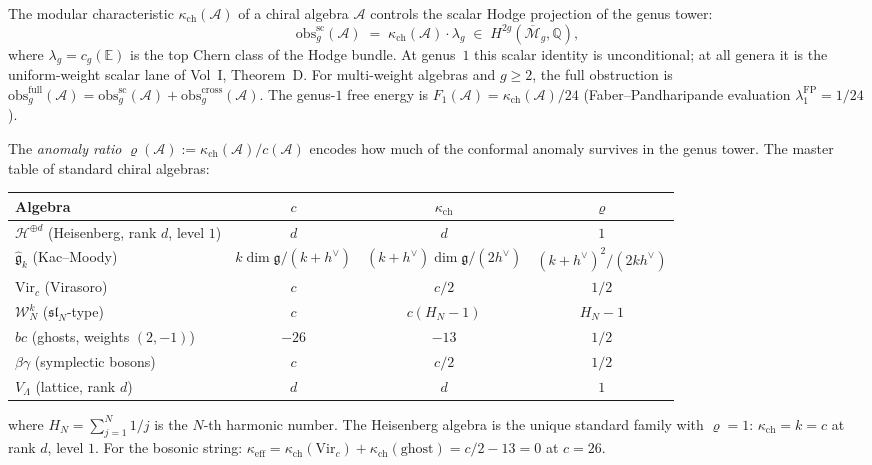 
The modular characteristic $\kappa_{\mathrm{ch}}(\mathcal{A})$ of a chiral algebra $\mathcal{A}$ controls the scalar Hodge projection of the genus tower:
\begin{equation}
\label{eq:phys-anom-obs-g}
 \mathrm{obs}^{\mathrm{sc}}_g(\mathcal{A}) \;=\; \kappa_{\mathrm{ch}}(\mathcal{A}) \cdot \lambda_g
 \;\in\; H^{2g}(\overline{\mathcal{M}}_g, \mathbb{Q}),
\end{equation}
where $\lambda_g = c_g(\mathbb{E})$ is the top Chern class of the Hodge bundle. At genus~$1$ this scalar identity is unconditional; at all genera it is the uniform-weight scalar lane of Vol~I, Theorem~D. For multi-weight algebras and $g\geq2$, the full obstruction is $\mathrm{obs}^{\mathrm{full}}_g(\mathcal{A})=\mathrm{obs}^{\mathrm{sc}}_g(\mathcal{A})+\mathrm{obs}^{\mathrm{cross}}_g(\mathcal{A})$. The genus-$1$ free energy is $F_1(\mathcal{A}) = \kappa_{\mathrm{ch}}(\mathcal{A})/24$ (Faber--Pandharipande evaluation $\lambda_1^{\mathrm{FP}} = 1/24$).

The \emph{anomaly ratio} $\varrho(\mathcal{A}) := \kappa_{\mathrm{ch}}(\mathcal{A})/c(\mathcal{A})$ encodes how much of the conformal anomaly survives in the genus tower. The master table of standard chiral algebras:
\begin{center}
\renewcommand{\arraystretch}{1.3}
\begin{tabular}{lccc}
\textbf{Algebra} & $c$ & $\kappa_{\mathrm{ch}}$ & $\varrho$ \\ \hline
$\mathcal{H}^{\oplus d}$ (Heisenberg, rank $d$, level $1$) & $d$ & $d$ & $1$ \\
$\widehat{\mathfrak{g}}_k$ (Kac--Moody) &
 $k\dim\mathfrak{g}/(k+h^\vee)$ &
 $(k+h^\vee)\dim\mathfrak{g}/(2h^\vee)$ &
 $(k+h^\vee)^2/(2kh^\vee)$ \\
$\mathrm{Vir}_c$ (Virasoro) & $c$ & $c/2$ & $1/2$ \\
$\mathcal{W}_N^k$ ($\mathfrak{sl}_N$-type) & $c$ & $c(H_N - 1)$ & $H_N - 1$ \\
$bc$ (ghosts, weights $(2,-1)$) & $-26$ & $-13$ & $1/2$ \\
$\beta\gamma$ (symplectic bosons) & $c$ & $c/2$ & $1/2$ \\
$V_\Lambda$ (lattice, rank $d$) & $d$ & $d$ & $1$
\end{tabular}
\end{center}
where $H_N = \sum_{j=1}^N 1/j$ is the $N$-th harmonic number. The Heisenberg algebra is the unique standard family with $\varrho = 1$: $\kappa_{\mathrm{ch}} = k = c$ at rank $d$, level $1$. For the bosonic string: $\kappa_{\mathrm{eff}} = \kappa_{\mathrm{ch}}(\mathrm{Vir}_c) + \kappa_{\mathrm{ch}}(\mathrm{ghost}) = c/2 - 13 = 0$ at $c = 26$.

